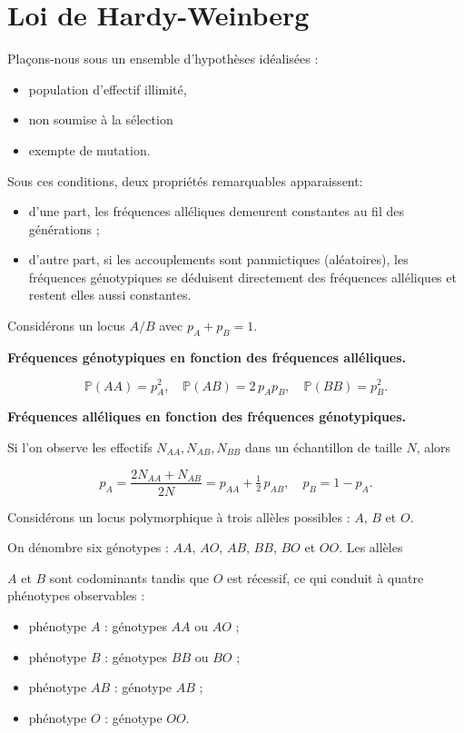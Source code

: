 \section{Loi de Hardy-Weinberg}

Plaçons-nous sous un ensemble d'hypothèses idéalisées : 

\begin{itemize}
\item population d'effectif illimité, 
\item non soumise à la sélection  
\item exempte de mutation. 
\end{itemize}

Sous ces conditions, deux propriétés remarquables apparaissent: 

\begin{itemize}
\item d'une part, les fréquences alléliques demeurent constantes au fil des générations ; 
\item d'autre part, si les accouplements sont panmictiques (aléatoires), les fréquences génotypiques se déduisent directement des fréquences alléliques et restent elles aussi constantes.
\end{itemize}

Considérons un locus $A/B$ avec $p_A + p_B = 1$.

\textbf{Fréquences génotypiques en fonction des fréquences alléliques.}

$$
\mathbb{P}(AA) = p_A^2, \quad \mathbb{P}(AB) = 2\, p_A p_B, \quad \mathbb{P}(BB) = p_B^2 .
$$

\textbf{Fréquences alléliques en fonction des fréquences génotypiques.}

Si l'on observe les effectifs $N_{AA}, N_{AB}, N_{BB}$ dans un échantillon de taille $N$, alors

$$
p_A = \frac{2 N_{AA} + N_{AB}}{2N} = p_{AA} + \tfrac{1}{2}\, p_{AB}, \quad p_B = 1 - p_A .
$$

\begin{exemple}
Considérons un locus polymorphique à trois allèles possibles : $A$, $B$ et $O$.

On dénombre six génotypes : $AA$, $AO$, $AB$, $BB$, $BO$ et $OO$. Les allèles

$A$ et $B$ sont codominants tandis que $O$ est récessif, ce qui conduit à quatre phénotypes observables :

\begin{itemize}
  \item phénotype $A$ : génotypes $AA$ ou $AO$ ;
  \item phénotype $B$ : génotypes $BB$ ou $BO$ ;
  \item phénotype $AB$ : génotype $AB$ ;
  \item phénotype $O$ : génotype $OO$.
\end{itemize}
\end{exemple}

